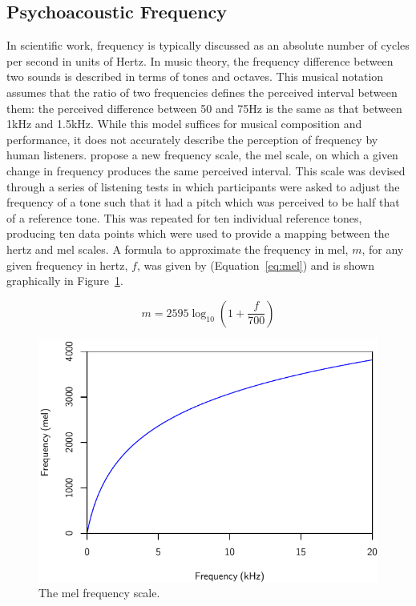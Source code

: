 	\subsection{Psychoacoustic Frequency}
	\label{sec:Timbre-PsychoacousticPrinciples-Frequency}
		In scientific work, frequency is typically discussed as an absolute number of cycles per second in units of
		Hertz. In music theory, the frequency difference between two sounds is described in terms of tones and
		octaves.  This musical notation assumes that the ratio of two frequencies defines the perceived interval
		between them: the perceived difference between 50 and 75Hz is the same as that between 1kHz and 1.5kHz.
		While this model suffices for musical composition and performance, it does not accurately describe the
		perception of frequency by human listeners. \citet{stevens1937a} propose a new frequency scale, the mel
		scale, on which a given change in frequency produces the same perceived interval. This scale was devised
		through a series of listening tests in which participants were asked to adjust the frequency of a tone such
		that it had a pitch which was perceived to be half that of a reference tone. This was repeated for ten
		individual reference tones, producing ten data points which were used to provide a mapping between the
		hertz and mel scales. A formula to approximate the frequency in mel, $m$, for any given frequency in hertz,
		$f$, was given by \citet{oshaughnessy2000speech} (Equation~\ref{eq:mel}) and is shown graphically in
		Figure~\ref{fig:MelScale}.

		\begin{equation}
			m = 2595 \log_{10} \left(1 + \frac{f}{700} \right)
			\label{eq:mel}
		\end{equation}

		\begin{figure}[h!]
			\centering
			\includegraphics{chapter2/Images/MelScale.pdf}
			\caption{The mel frequency scale.}
			\label{fig:MelScale}
		\end{figure}

